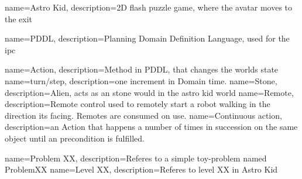 \makeglossaries

{
	name={Astro Kid},
	description={2D flash puzzle game, where the avatar moves to the exit }
}

{
	name={PDDL},
	description={Planning Domain Definition Language, used for the \acrshort{ipc}}
}

{
	name={Action},
	description={Method in PDDL, that changes the worlds state}
}
{
	name={turn/step},
	description={one increment in Domain time.}
}
{
	name={Stone},
	description={Alien, acts as an stone would in the astro kid world}
} 
 {
 	name={Remote},
 	description={Remote control used to remotely start a robot walking in the direction its facing. Remotes are consumed on use.}
 } 
 {
 	name={Continuous action},
 	description={an Action that happens a number of times in succession on the same object until an precondition is fulfilled.}
 }
 
  {
  	name={Problem XX},
  	description={Referes to a simple toy-problem named ProblemXX}
  }
   {
   	name={Level XX},
   	description={Referes to level XX in Astro Kid}
   }

